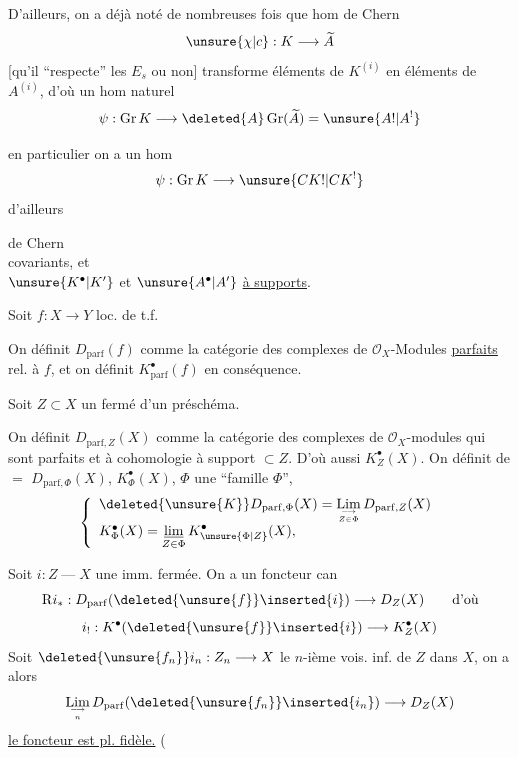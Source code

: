 D'ailleurs, on a déjà noté de nombreuses fois que  hom de Chern
\[
\unsure{\chi|c}:K\longrightarrow\widetilde A
\]
[qu'il ``respecte'' les $E_s$ ou non] transforme éléments de $K^{(i)}$ en éléments de $A^{(i)}$, d'où un hom naturel 
\[
\psi:\operatorname{Gr}K\longrightarrow\deleted{A}\operatorname{Gr}(\widetilde A)=\unsure{A!|A^!}
\]
\margin{[$\simeq A$ additivement\deleted{]} en degrés $\ne0$]}

en particulier on a un hom
\[
\psi:\operatorname{Gr}K\longrightarrow\unsure{CK!|CK^!}
\]
 d'ailleurs
\begin{flushright}
 de Chern\\
covariants, et\\
$\unsure{K^\bullet|K'}$ et $\unsure{A^\bullet|A'}$ \uline{à supports}.
\end{flushright}
Soit $f:X\longrightarrow Y$ loc. de t.f.

On définit $D_{\mathrm{parf}}(f)$ comme la catégorie  des complexes de $\mathcal O_X$-Modules \uline{parfaits} rel. à $f$, et on définit $K^\bullet_{\mathrm{parf}}(f)$ en conséquence.

Soit $Z\subset X$ un fermé d'un préschéma.

On définit $D_{\mathrm{parf},Z}(X)$ comme la catégorie des complexes de $\mathcal O_X$-modules qui sont parfaits et à cohomologie à support $\subset Z$. D'où aussi $K_Z^\bullet(X)$.
On définit de $=$ $D_{\mathrm{parf},\Phi}(X)$, $K_\Phi^\bullet(X)$, $\Phi$ une ``famille $\Phi$'', 
\[
\left\{\begin{array}{l}
\deleted{\unsure{K}}D_{\mathrm{parf},\Phi}(X)=\displaystyle\mathop{\mathrm{Lim}}\limits_{\longrightarrow\atop Z\in\Phi}D_{\mathrm{parf},Z}(X)\\
K_\Phi^\bullet(X)=\displaystyle\mathop{\underline{\lim}}\limits_{Z\in\Phi}K^\bullet_{\unsure{\Phi|Z}}(X),
\end{array}\right.
\]

Soit $i:Z\mathbin{\text{---}}X$ une imm. fermée. On a un foncteur can
\[
\mathrm Ri_*:D_{\mathrm{parf}}(\deleted{\unsure{f}}\inserted{i})\longrightarrow D_Z(X)\qquad\text{d'où}
\]
\[
i_!:K^\bullet(\deleted{\unsure{f}}\inserted{i})\longrightarrow K_Z^\bullet(X)
\]
Soit $\deleted{\unsure{f_n}}i_n:Z_n\longrightarrow X$ le $n$-ième vois. inf. de $Z$ dans $X$, on a alors
\[
\mathop{\mathrm{Lim}}\limits_{\longrightarrow\atop n}D_{\mathrm{parf}}(\deleted{\unsure{f_n}}\inserted{i_n})\longrightarrow D_Z(X)
\]
\uline{le foncteur est pl. fidèle.}
(

